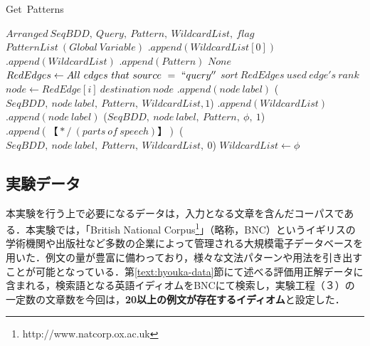\documentclass[12pt,twoside, fleqn]{ujbook}
\begin{document}
	\newpage
	\begin{algorithm}
	\caption{Get\ Patterns}
	\label{alg:get_patterns}
	\begin{algorithmic}[1]
	\REQUIRE $Arranged\ SeqBDD,\ Query,\ Pattern,\ WildcardList,\ flag$
	\ENSURE	$PatternList\ (Global\ Variable)$
				$.append(WildcardList[0])$
			\ENDIF
			$.append(WildcardList)$
			$.append(Pattern)$
			\RETURN $None$
		\ENDIF
		\STATE $RedEdges \leftarrow All\ edges\ that\ source\ =\ ``query''$
		\STATE $sort\ RedEdges\ used\ edge's\ rank$
			\STATE $node \leftarrow RedEdge[i]\ destination\ node$
				$.append(node\ label)$
				($SeqBDD,\ node\ label,\ Pattern,\ WildcardList, 1$)
				$.append(WildcardList)$
				$.append(node\ label)$
				($SeqBDD,\ node\ label,\ Pattern,\ \phi,\ 1$)
			\ELSE
				$.append(【*/\ (parts\ of\ speech)】)$
				($SeqBDD,\ node\ label,\ Pattern,\ WildcardList,\ 0$)
			\ENDIF
		\STATE $WildcardList \leftarrow \phi$
		\ENDFOR

	\end{algorithmic}
	\end{algorithm}


	\subsection{実験データ}
	本実験を行う上で必要になるデータは，入力となる文章を含んだコーパスである．本実験では，「British National Corpus\footnote{http://www.natcorp.ox.ac.uk}」（略称，BNC）というイギリスの学術機関や出版社など多数の企業によって管理される大規模電子データベースを用いた．例文の量が豊富に備わっており，様々な文法パターンや用法を引き出すことが可能となっている．第\ref{text:hyouka-data}節にて述べる評価用正解データに含まれる，検索語となる英語イディオムをBNCにて検索し，実験工程（３）の一定数の文章数を今回は，{\bf 20以上の例文が存在するイディオム}と設定した．
\end{document}
